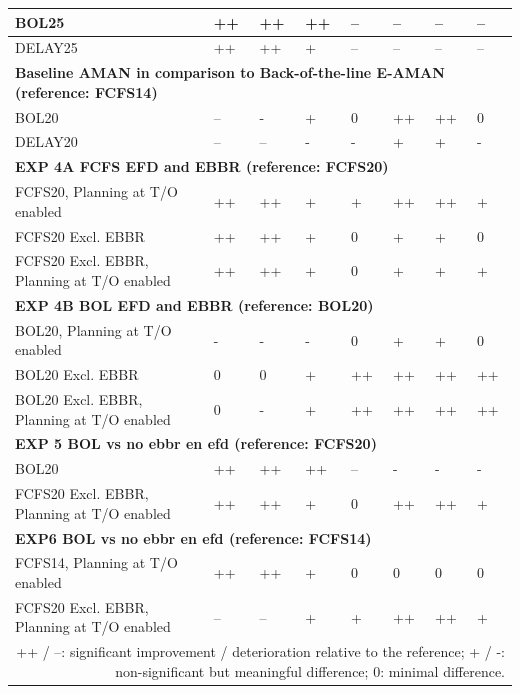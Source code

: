 \begin{table}[htbp]
\begin{center}
\begin{tabular}{|p{4.6cm}|p{1.45cm}|p{1.45cm}|p{1.45cm}|p{1.45cm}|p{1.45cm}|p{1.45cm}|p{1.45cm}|}
\hline
BOL25 & ++ & ++ & ++ & -- & -- & -- & -- \\
\hline
DELAY25 & ++ & ++ & + & -- & -- & -- & -- \\
\hline
\hline\hline
\multicolumn{8}{|l|}{\textbf{Baseline AMAN in comparison to Back-of-the-line E-AMAN (reference: FCFS14)}} \\
\hline
BOL20 & -- & - & + & 0 & ++ & ++ & 0 \\
\hline
DELAY20 & -- & -- & - & - & + & + & - \\
\hline
\hline\hline
\multicolumn{8}{|l|}{\textbf{EXP 4A FCFS EFD and EBBR (reference: FCFS20)}} \\
\hline
FCFS20, Planning at T/O enabled & ++ & ++ & + & + & ++ & ++ & + \\
\hline
FCFS20 Excl. EBBR & ++ & ++ & + & 0 & + & + & 0 \\
\hline
FCFS20 Excl. EBBR, Planning at T/O enabled & ++ & ++ & + & 0 & + & + & + \\
\hline
\hline\hline
\multicolumn{8}{|l|}{\textbf{EXP 4B BOL EFD and EBBR (reference: BOL20)}} \\
\hline
BOL20, Planning at T/O enabled & - & - & - & 0 & + & + & 0 \\
\hline
BOL20 Excl. EBBR & 0 & 0 & + & ++ & ++ & ++ & ++ \\
\hline
BOL20 Excl. EBBR, Planning at T/O enabled & 0 & - & + & ++ & ++ & ++ & ++ \\
\hline
\hline\hline
\multicolumn{8}{|l|}{\textbf{EXP 5 BOL vs no ebbr en efd (reference: FCFS20)}} \\
\hline
BOL20 & ++ & ++ & ++ & -- & - & - & - \\
\hline
FCFS20 Excl. EBBR, Planning at T/O enabled & ++ & ++ & + & 0 & ++ & ++ & + \\
\hline
\hline\hline
\multicolumn{8}{|l|}{\textbf{EXP6 BOL vs no ebbr en efd (reference: FCFS14)}} \\
\hline
FCFS14, Planning at T/O enabled & ++ & ++ & + & 0 & 0 & 0 & 0 \\
\hline
FCFS20 Excl. EBBR, Planning at T/O enabled & -- & -- & + & + & ++ & ++ & + \\
\hline
\multicolumn{8}{r}{{\footnotesize ++ / --: significant improvement / deterioration relative to the reference; + / -: non-significant but meaningful difference; 0: minimal difference.}}\\
\end{tabular}
\label{tab:overall\_experiment\_summary}
\end{center}
\end{table}